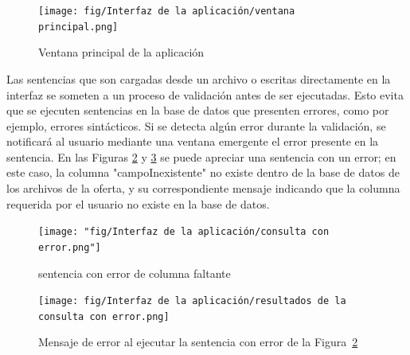 \begin{figure}[H]
    \centering
    \texttt{[image: fig/Interfaz de la aplicación/ventana principal.png]}
    \caption{Ventana principal de la aplicación}
    \label{fig:mainWindow}
\end{figure}

Las sentencias que son cargadas desde un archivo o escritas directamente en la interfaz se someten a un proceso de validación antes de ser ejecutadas. Esto evita que se ejecuten sentencias en la base de datos que presenten errores, como por ejemplo, errores sintácticos. Si se detecta algún error durante la validación, se notificará al usuario mediante una ventana emergente el error presente en la sentencia. En las Figuras \ref{fig:queryWithColumnError} y \ref{fig:messageQueryWithColumnError} se puede apreciar una sentencia con un error; en este caso, la columna "campoInexistente" no existe dentro de la base de datos de los archivos de la oferta, y su correspondiente mensaje indicando que la columna requerida por el usuario no existe en la base de datos.

\begin{figure}[H]
    \centering
    \texttt{[image: "fig/Interfaz de la aplicación/consulta con error.png"]}
    \caption{sentencia con error de columna faltante}
    \label{fig:queryWithColumnError}
\end{figure}


\begin{figure}[H]
    \centering
    \texttt{[image: fig/Interfaz de la aplicación/resultados de la consulta con error.png]}
    \caption{Mensaje de error al ejecutar la sentencia con error de la Figura~\ref{fig:queryWithColumnError}}
    \label{fig:messageQueryWithColumnError}
\end{figure}

